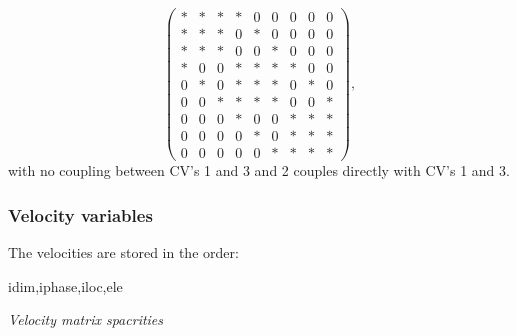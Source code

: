 \begin{equation}
  \begin{pmatrix}
*  &  *  &  *      &   *   &  0  &  0    &   0   &  0  &  0   \\ 
*  &  *  &  *      &   0   &  *  &  0    &   0   &  0  &  0  \\ 
*  &  *  &  *      &   0   &  0  &  *    &   0   &  0  &  0  \\ 
%
*  &  0  &  0      &   *   &  *  &  *    &   *   &  0  &  0  \\
0  &  *  &  0      &   *   &  *  &  *    &   0   &  *  &  0  \\
0  &  0  &  *      &   *   &  *  &  *    &   0   &  0  &  *  \\
%
0  &  0  &  0      &   *   &  0  &  0    &   *   &  *  &  *  \\
0  &  0  &  0      &   0   &  *  &  0    &   *   &  *  &  *  \\
0  &  0  &  0      &   0   &  0  &  *    &   *   &  *  &  *  
  \end{pmatrix},
\label{optimal-CV-mat-spar-3CV}
\end{equation}
with no coupling between CV's 1 and 3 and 2 couples directly with CV's 
1 and 3. 



\subsubsection{Velocity variables} 
The velocities are stored in the order: 
\par\noindent
idim,iphase,iloc,ele


\par\noindent
{\it Velocity matrix spacrities} 

